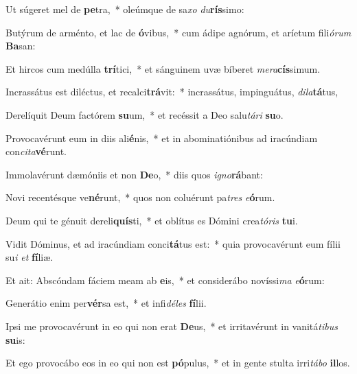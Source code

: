 \item Ut súgeret mel de \textbf{pe}tra,~* oleúmque de sa\textit{xo} \textit{du}\textbf{rís}simo:
\item Butýrum de arménto, et lac de \textbf{ó}vibus,~* cum ádipe agnórum, et aríetum fili\textit{ó}\textit{rum} \textbf{Ba}san:
\item Et hircos cum medúlla \textbf{trí}tici,~* et sánguinem uvæ bíberet \textit{me}\textit{ra}\textbf{cís}simum.
\item Incrassátus est diléctus, et recalci\textbf{trá}vit:~* incrassátus, impinguátus, \textit{di}\textit{la}\textbf{tá}tus,
\item Derelíquit Deum factórem \textbf{su}um,~* et recéssit a Deo salu\textit{tá}\textit{ri} \textbf{su}o.
\item Provocavérunt eum in diis ali\textbf{é}nis,~* et in abominatiónibus ad iracúndiam con\textit{ci}\textit{ta}\textbf{vé}runt.
\item Immolavérunt dæmóniis et non \textbf{De}o,~* diis quos \textit{i}\textit{gno}\textbf{rá}bant:
\item Novi recentésque ve\textbf{né}runt,~* quos non coluérunt pa\textit{tres} \textit{e}\textbf{ó}rum.
\item Deum qui te génuit dereli\textbf{quís}ti,~* et oblítus es Dómini crea\textit{tó}\textit{ris} \textbf{tu}i.
\item Vidit Dóminus, et ad iracúndiam conci\textbf{tá}tus est:~* quia provocavérunt eum fílii su\textit{i} \textit{et} \textbf{fí}liæ.
\item Et ait: Abscóndam fáciem meam ab \textbf{e}is,~* et considerábo novíssi\textit{ma} \textit{e}\textbf{ó}rum:
\item Generátio enim per\textbf{vér}sa est,~* et infi\textit{dé}\textit{les} \textbf{fí}lii.
\item Ipsi me provocavérunt in eo qui non erat \textbf{De}us,~* et irritavérunt in vanitá\textit{ti}\textit{bus} \textbf{su}is:
\item Et ego provocábo eos in eo qui non est \textbf{pó}pulus,~* et in gente stulta irri\textit{tá}\textit{bo} \textbf{il}los.
